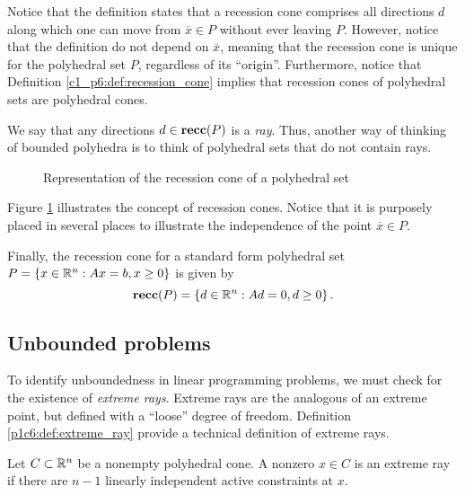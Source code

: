 Notice that the definition states that a recession cone comprises all directions $d$ along which one can move from $\overline{x} \in P$ without ever leaving $P$. However, notice that the definition do not depend on $\overline{x}$, meaning that the recession cone is unique for the polyhedral set $P$, regardless of its ``origin''. Furthermore, notice that Definition \ref{c1_p6:def:recession_cone} implies that recession cones of polyhedral sets are polyhedral cones. 

We say that any directions $d \in {\bf recc}(P)$ is a \emph{ray}. Thus, another way of thinking of bounded polyhedra is to think of polyhedral sets that do not contain rays. 

\begin{figure}[h]
	\caption{Representation of the recession cone of a polyhedral set} \label{p1c6:fig:recession_cone}	
\end{figure}

Figure \ref{p1c6:fig:recession_cone} illustrates the concept of recession cones. Notice that it is purposely placed in several places to illustrate the independence of the point $\overline{x} \in P$.

Finally, the recession cone for a standard form polyhedral set $P = \left\{ x \in \mathbb{R}^n : Ax = b, x \geq 0 \right \}$ is given by 
%
\begin{equation*}
	{\bf recc}(P) = \left\{ d \in \mathbb{R}^n : Ad = 0, d \geq 0 \right \}.	
\end{equation*} 


\subsection{Unbounded problems}

To identify unboundedness in linear programming problems, we must check for the existence of \emph{extreme rays}. Extreme rays are the analogous of an extreme point, but defined with a ``loose'' degree of freedom. Definition \ref{p1c6:def:extreme_ray} provide a technical definition of extreme rays.

\begin{definition} \label{p1c6:def:extreme_ray}
	Let $C \subset \mathbb{R}^n$ be a nonempty polyhedral cone. A nonzero $x \in C$ is an extreme ray if there are $n-1$ linearly independent active constraints at $x$.
\end{definition} 

